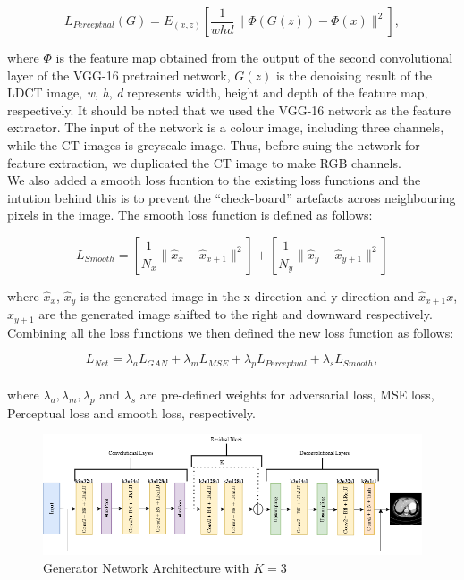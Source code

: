 \documentclass[journal]{IEEEtran}
\begin{document}
\begin{equation}
	L_{Perceptual}(G) = E_{(x,z)}\left[ \frac{1}{whd}\|\Phi(G(z))-\Phi(x)\|^2 \right],
\end{equation}

	where $\Phi$ is the feature map obtained from the output of the second convolutional layer of the VGG-16 pretrained network, $G(z)$ is the denoising result of the LDCT image, \emph{w}, \emph{h}, \emph{d} represents width, height and depth of the feature map, respectively.  It should be noted that we used the VGG-16 network as the feature extractor.  The input of the network is a colour image, including three channels, while the CT images is greyscale image.  Thus, before suing the network for feature extraction, we duplicated the CT image to make RGB channels.\\
	We also added a smooth loss fucntion to the existing loss functions and the intution behind this is to prevent the ``check-board'' artefacts across neighbouring pixels in the image.  The smooth loss function is defined as follows:

\begin{equation}
	L_{Smooth} = \left[ \frac{1}{N_x}\|\hat{x}_x - \hat{x}_{x+1}\|^2 \right]+ \left[ \frac{1}{N_y}\|\hat{x}_y - \hat{x}_{y+1}\|^2 \right]
\end{equation}

	where $\hat{x}_x$, $\hat{x}_y$ is the generated image in the x-direction and y-direction and $\hat{x}_{x+1}x$, $\hat{x}_{y+1}$ are the generated image shifted to the right and downward respectively. \\	
	Combining all the loss functions we then defined the new loss function as follows:
	
\begin{equation}
	L_{Net} = \lambda_a L_{GAN} + \lambda_m L_{MSE} + \lambda_p L_{Perceptual} + \lambda_s L_{Smooth},
\end{equation}\\

where $\lambda_a, \lambda_m, \lambda_p$ and $\lambda_s$ are pre-defined weights for adversarial loss, MSE loss, Perceptual loss and smooth loss, respectively.
	
\begin{figure}[h]
    \centering
    \includegraphics[width=15cm]{generator}
    \caption{Generator Network Architecture with $K=3$}
    \label{generator}
\end{figure}
\end{document}
